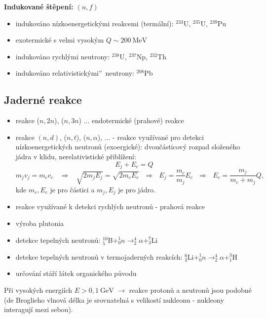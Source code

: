 \documentclass[../../main.tex]{subfiles}
\begin{document}
\textbf{Indukované štěpení: $(n,f)$}
\begin{itemize}
	\item indukováno nízkoenergetickými reakcemi (termální): $^{233}$U, $^{235}$U, $^{239}$Pu
	\item exotermické s velmi vysokým $ Q \sim 200 ~\mathrm{MeV}$
	\item indukováno rychlými neutrony: $^{238}$U, $^{237}$Np, $^{232}$Th
	\item indukováno \quotedblbase relativistickými\textquotedblright ~neutrony: $^{208}$Pb
\end{itemize}
	
\subsection{Jaderné reakce}	
	
\begin{itemize}	
	\item reakce ($n,2n$), ($n, 3n$) ... endotermické (prahové) reakce
	\item reakce $(n,d)$, ($n,t$), ($n, \alpha$), ... - reakce využívané pro detekci nízkoenergetických neutronů (exoergické): dvoučásticový rozpad složeného jádra v klidu, nerelativistické přiblížení:
	\begin{equation}
	E_j + E_c = Q
	\end{equation}
	\begin{equation}
	m_j v_j = m_c v_c ~~~~ \Rightarrow ~~~~ \sqrt{2 m_j E_j } = \sqrt{2 m_c E_c} ~~~ \Rightarrow ~~~ E_j = \dfrac{m_c}{m_j} E_c ~~~ \Rightarrow ~~~ E_c = \dfrac{m_j}{m_c + m_j} Q,
	\end{equation}
	kde $m_c, E_c$ je pro částici a $m_j, E_j$ je pro jádro.
	\item reakce využívané k detekci rychlých neutronů - prahová reakce
	\item výroba plutonia
	\item detekce tepelných neutronů: $^{10}_{5}$B$ + ^{1}_{0}n \rightarrow ^{4}_{2}\alpha + ^{7}_{3}$Li 
	\item detekce tepelných neutronů v termojaderných reakcích: $^{6}_{3}$Li$ + ^{1}_{0}n \rightarrow ^{4}_{2}\alpha + ^{3}_{1}$H 
	\item určování stáří látek organického původu
\end{itemize}	
Při vysokých energiích $E > 0,1 ~\mathrm{GeV}$ $\rightarrow$ reakce protonů a neutronů jsou podobné (de Broglieho vlnová délka je srovnatelná s velikostí nukleonu - nukleony interagují mezi sebou).
\end{document}
